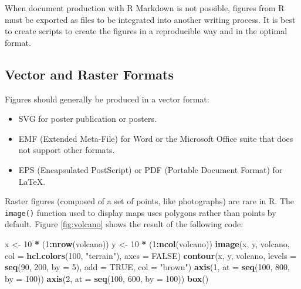 \documentclass[
  12pt,
  american,
  a4paper,
  extrafontsizes,onecolumn,openright
  ]{memoir}
\newenvironment{Shaded}{\begin{snugshade}}{\end{snugshade}}
\newcommand{\AttributeTok}[1]{\textcolor[rgb]{0.13,0.29,0.53}{#1}}
\newcommand{\ConstantTok}[1]{\textcolor[rgb]{0.56,0.35,0.01}{#1}}
\newcommand{\DecValTok}[1]{\textcolor[rgb]{0.00,0.00,0.81}{#1}}
\newcommand{\FunctionTok}[1]{\textcolor[rgb]{0.13,0.29,0.53}{\textbf{#1}}}
\newcommand{\NormalTok}[1]{#1}
\newcommand{\OtherTok}[1]{\textcolor[rgb]{0.56,0.35,0.01}{#1}}
\newcommand{\SpecialCharTok}[1]{\textcolor[rgb]{0.81,0.36,0.00}{\textbf{#1}}}
\newcommand{\StringTok}[1]{\textcolor[rgb]{0.31,0.60,0.02}{#1}}
\providecommand{\tightlist}{%
  \setlength{\itemsep}{0pt}\setlength{\parskip}{0pt}}
\begin{document}
When document production with R Markdown is not possible, figures from R must be exported as files to be integrated into another writing process.
It is best to create scripts to create the figures in a reproducible way and in the optimal format.

\subsection{Vector and Raster Formats}\label{vector-and-raster-formats}

Figures should generally be produced in a vector format:

\begin{itemize}
\tightlist
\item
  SVG for poster publication or posters.
\item
  EMF (Extended Meta-File) for Word or the Microsoft Office suite that does not support other formats.
\item
  EPS (Encapsulated PostScript) or PDF (Portable Document Format) for LaTeX.
\end{itemize}

Raster figures (composed of a set of points, like photographs) are rare in R.
The \texttt{image()} function used to display maps uses polygons rather than points by default.
Figure \ref{fig:volcano} shows the result of the following code:



\scriptsize

\begin{Shaded}
\begin{Highlighting}[]
\NormalTok{x }\OtherTok{\textless{}{-}} \DecValTok{10} \SpecialCharTok{*}\NormalTok{ (}\DecValTok{1}\SpecialCharTok{:}\FunctionTok{nrow}\NormalTok{(volcano))}
\NormalTok{y }\OtherTok{\textless{}{-}} \DecValTok{10} \SpecialCharTok{*}\NormalTok{ (}\DecValTok{1}\SpecialCharTok{:}\FunctionTok{ncol}\NormalTok{(volcano))}
\FunctionTok{image}\NormalTok{(x, y, volcano, }\AttributeTok{col =} \FunctionTok{hcl.colors}\NormalTok{(}\DecValTok{100}\NormalTok{, }\StringTok{"terrain"}\NormalTok{), }\AttributeTok{axes =} \ConstantTok{FALSE}\NormalTok{)}
\FunctionTok{contour}\NormalTok{(x, y, volcano, }\AttributeTok{levels =} \FunctionTok{seq}\NormalTok{(}\DecValTok{90}\NormalTok{, }\DecValTok{200}\NormalTok{, }\AttributeTok{by =} \DecValTok{5}\NormalTok{), }\AttributeTok{add =} \ConstantTok{TRUE}\NormalTok{,}
    \AttributeTok{col =} \StringTok{"brown"}\NormalTok{)}
\FunctionTok{axis}\NormalTok{(}\DecValTok{1}\NormalTok{, }\AttributeTok{at =} \FunctionTok{seq}\NormalTok{(}\DecValTok{100}\NormalTok{, }\DecValTok{800}\NormalTok{, }\AttributeTok{by =} \DecValTok{100}\NormalTok{))}
\FunctionTok{axis}\NormalTok{(}\DecValTok{2}\NormalTok{, }\AttributeTok{at =} \FunctionTok{seq}\NormalTok{(}\DecValTok{100}\NormalTok{, }\DecValTok{600}\NormalTok{, }\AttributeTok{by =} \DecValTok{100}\NormalTok{))}
\FunctionTok{box}\NormalTok{()}
\end{Highlighting}
\end{Shaded}
\end{document}

